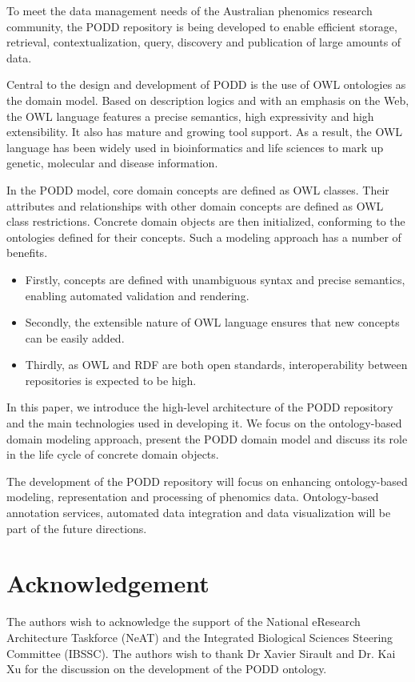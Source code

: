 \documentclass{llncs}
\begin{document}
To meet the data management needs of the Australian phenomics
research community, the PODD repository is being developed to enable
efficient storage, retrieval, contextualization, query, discovery
and publication of large amounts of data.

Central to the design and development of PODD is the use of OWL
ontologies as the domain model. Based on description logics and with
an emphasis on the Web, the OWL language features a precise
semantics, high expressivity and high extensibility. It also has
mature and growing tool support. As a result, the OWL language has
been widely used in bioinformatics and life sciences to mark up
genetic, molecular and disease information.

In the PODD model, core domain concepts are defined as OWL classes.
Their attributes and relationships with other domain concepts are
defined as OWL class restrictions. Concrete domain objects are then
initialized, conforming to the ontologies defined for their
concepts. Such a modeling approach has a number of benefits.

\begin{itemize}
\item Firstly, concepts are defined with unambiguous syntax and
precise semantics, enabling automated validation and rendering.

\item Secondly, the extensible nature of OWL language ensures that
new concepts can be easily added.

\item Thirdly, as OWL and RDF are both open standards,
interoperability between repositories is expected to be high.
\end{itemize}

In this paper, we introduce the high-level architecture of the PODD
repository and the main technologies used in developing it. We focus
on the ontology-based domain modeling approach, present the PODD
domain model and discuss its role in the life cycle of concrete
domain objects.

The development of the PODD repository will focus on enhancing
ontology-based modeling, representation and processing of phenomics
data. Ontology-based annotation services, automated data integration
and data visualization will be part of the future directions.

\section*{Acknowledgement}
The authors wish to acknowledge the support of the National
eResearch Architecture Taskforce (NeAT) and the Integrated
Biological Sciences Steering Committee (IBSSC). The authors wish to
thank Dr Xavier Sirault and Dr. Kai Xu for the discussion on the
development of the PODD ontology.
\end{document}
